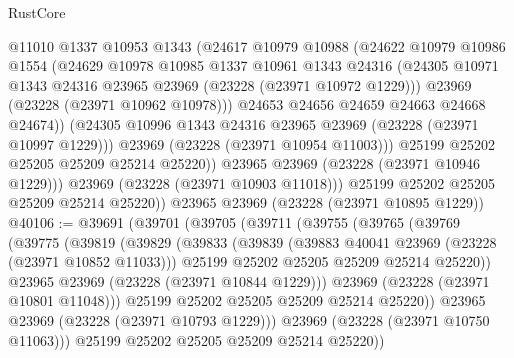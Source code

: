 \begin{lexlean}{RustCore}
\begin{coremodule}
                  @11010
                  @1337
                  @10953
                  @1343
                  (@24617
                    @10979
                    @10988
                    (@24622
                      @10979
                      @10986
                      @1554
                      (@24629
                        @10978
                        @10985
                        @1337
                        @10961
                        @1343
                        @24316
                        (@24305 @10971 @1343 @24316 @23965 @23969 (@23228 (@23971 @10972 @1229)))
                        @23969
                        (@23228 (@23971 @10962 @10978)))
                      @24653
                      @24656
                      @24659
                      @24663
                      @24668
                      @24674))
                  (@24305 @10996 @1343 @24316 @23965 @23969 (@23228 (@23971 @10997 @1229)))
                  @23969
                  (@23228 (@23971 @10954 @11003)))
                @25199
                @25202
                @25205
                @25209
                @25214
                @25220))
            @23965
            @23969
            (@23228 (@23971 @10946 @1229)))
          @23969
          (@23228 (@23971 @10903 @11018)))
        @25199
        @25202
        @25205
        @25209
        @25214
        @25220))
    @23965
    @23969
    (@23228 (@23971 @10895 @1229))
@40106 := @39691
    (@39701
      (@39705
        (@39711
          (@39755
            (@39765
              (@39769
                (@39775
                  (@39819
                    (@39829
                      (@39833
                        (@39839
                          (@39883 @40041 @23969 (@23228 (@23971 @10852 @11033)))
                          @25199
                          @25202
                          @25205
                          @25209
                          @25214
                          @25220))
                      @23965
                      @23969
                      (@23228 (@23971 @10844 @1229)))
                    @23969
                    (@23228 (@23971 @10801 @11048)))
                  @25199
                  @25202
                  @25205
                  @25209
                  @25214
                  @25220))
              @23965
              @23969
              (@23228 (@23971 @10793 @1229)))
            @23969
            (@23228 (@23971 @10750 @11063)))
          @25199
          @25202
          @25205
          @25209
          @25214
          @25220))

\end{coremodule}
\end{lexlean}
